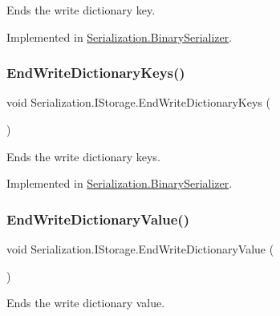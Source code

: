Ends the write dictionary key. 



Implemented in \hyperlink{class_serialization_1_1_binary_serializer_a82fe2baa2c969b618c2729a8113edaa1}{Serialization.\+Binary\+Serializer}.

\mbox{\label{interface_serialization_1_1_i_storage_a3b92e2da24caf59872668c269d102e87}} 
\subsubsection{\texorpdfstring{End\+Write\+Dictionary\+Keys()}{EndWriteDictionaryKeys()}}
{\footnotesize\ttfamily void Serialization.\+I\+Storage.\+End\+Write\+Dictionary\+Keys (\begin{DoxyParamCaption}{ }\end{DoxyParamCaption})}



Ends the write dictionary keys. 



Implemented in \hyperlink{class_serialization_1_1_binary_serializer_a53b70a443f3bddc10ab34444ab58b08e}{Serialization.\+Binary\+Serializer}.

\mbox{\label{interface_serialization_1_1_i_storage_ab14d2fe3fc5d3ed7171435152b060bf2}} 
\subsubsection{\texorpdfstring{End\+Write\+Dictionary\+Value()}{EndWriteDictionaryValue()}}
{\footnotesize\ttfamily void Serialization.\+I\+Storage.\+End\+Write\+Dictionary\+Value (\begin{DoxyParamCaption}{ }\end{DoxyParamCaption})}



Ends the write dictionary value. 



